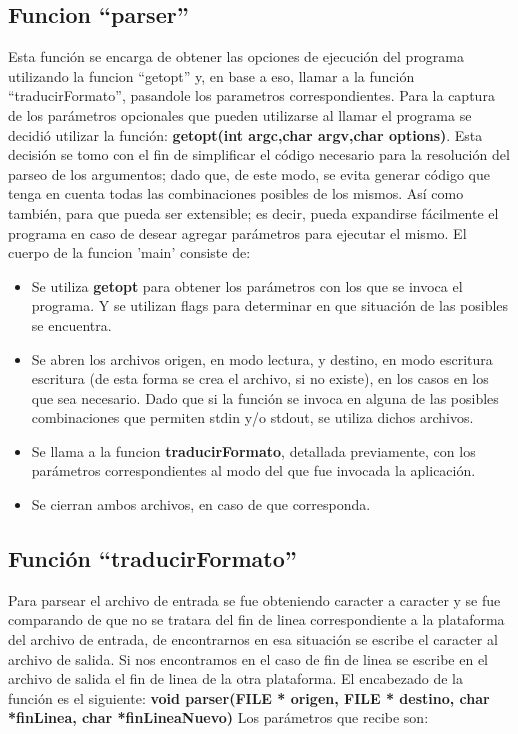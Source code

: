 \documentclass[a4paper,10pt]{article}
\begin{document}
  \subsection{Funcion ``parser''}
  Esta funci\'on se encarga de obtener las opciones de ejecuci\'on del programa utilizando la funcion ``getopt'' y, en base
  a eso, llamar a la funci\'on ``traducirFormato'', pasandole los parametros correspondientes.
  \newline
  Para la captura de los par\'ametros opcionales que pueden utilizarse al 
  llamar el programa se decidi\'o utilizar la funci\'on:
  \newline
  {\bf getopt(int argc,char\*\* argv,char\* options)}. 
  \newline
  Esta decisi\'on se tomo con el fin de simplificar el c\'odigo necesario para la resoluci\'on del parseo de los
  argumentos; dado que, de este modo, se evita generar c\'odigo que tenga
  en cuenta todas las combinaciones posibles de los mismos. As\'i como
  tambi\'en, para que pueda ser extensible; es decir, pueda expandirse
  f\'acilmente el programa en caso de desear agregar par\'ametros para
  ejecutar el mismo.
  El cuerpo de la funcion 'main' consiste de:
  \begin{itemize}
  \item Se utiliza {\bf getopt} para obtener los par\'ametros con los que se invoca el programa. Y se 
    utilizan flags para determinar en que situaci\'on de las posibles se encuentra.
  \item Se abren los archivos origen, en modo lectura, y destino, en modo escritura escritura (de esta
    forma se crea el archivo, si no existe), en los casos en los que sea necesario. Dado que si la funci\'on
    se invoca en alguna de las posibles combinaciones que permiten stdin y/o stdout, se utiliza dichos 
    archivos.
  \item Se llama a la funcion {\bf traducirFormato}, detallada previamente, con los par\'ametros 
    correspondientes al modo del que fue invocada la aplicaci\'on.
  \item Se cierran ambos archivos, en caso de que corresponda.
  \end{itemize}


  \subsection{Funci\'on ``traducirFormato''}
  Para parsear el archivo de entrada se fue obteniendo caracter a caracter y
  se fue comparando de que no se tratara del fin de linea
  correspondiente a la plataforma del archivo de entrada, de
  encontrarnos en esa situaci\'on se escribe el caracter al archivo de
  salida. Si nos encontramos en el caso de fin de linea se escribe en el
  archivo de salida el fin de linea de la otra plataforma. 
  El encabezado de la funci\'on es el siguiente:
  \newline
  {\bf void parser(FILE * origen, FILE * destino, char *finLinea, char *finLineaNuevo)}
  \newline
  Los par\'ametros que recibe son:
\end{document}
